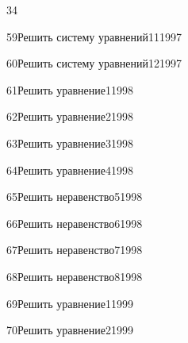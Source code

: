 \begin{TrigSourcePage}{34}
\begin{TrigExercise}{59}{Решить систему уравнений}{11}{1997}
\end{TrigExercise}
\begin{TrigExercise}{60}{Решить систему уравнений}{12}{1997}
\end{TrigExercise}
\begin{TrigExercise}{61}{Решить уравнение}{1}{1998}
\end{TrigExercise}
\begin{TrigExercise}{62}{Решить уравнение}{2}{1998}
\end{TrigExercise}
\begin{TrigExercise}{63}{Решить уравнение}{3}{1998}
\end{TrigExercise}
\begin{TrigExercise}{64}{Решить уравнение}{4}{1998}
\end{TrigExercise}
\begin{TrigExercise}{65}{Решить неравенство}{5}{1998}
\end{TrigExercise}
\begin{TrigExercise}{66}{Решить неравенство}{6}{1998}
\end{TrigExercise}
\begin{TrigExercise}{67}{Решить неравенство}{7}{1998}
\end{TrigExercise}
\begin{TrigExercise}{68}{Решить неравенство}{8}{1998}
\end{TrigExercise}
\begin{TrigExercise}{69}{Решить уравнение}{1}{1999}
\end{TrigExercise}
\begin{TrigExercise}{70}{Решить уравнение}{2}{1999}
\end{TrigExercise}
\end{TrigSourcePage}

